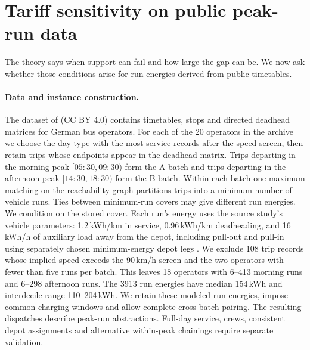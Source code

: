 \documentclass[11pt]{article}
\theoremstyle{definition}\newtheorem{definition}[theorem]{Definition}
\theoremstyle{remark}\newtheorem{remark}[theorem]{Remark}
\begin{document}
\section{Tariff sensitivity on public peak-run data}\label{sec:study}

The theory says when support can fail and how large the gap can be. We now ask
whether those conditions arise for run energies derived from public timetables.

\paragraph{Data and instance construction.}
The dataset of \citet{sistig2025dataset} (CC BY 4.0) contains timetables, stops
and directed deadhead matrices for German bus operators. For each of the 20
operators in the archive we choose the day type with the most service records
after the speed screen, then retain trips whose endpoints appear in the
deadhead matrix. Trips departing in the morning peak $[05{:}30,09{:}30)$ form the A batch
and trips departing in the afternoon peak $[14{:}30,18{:}30)$ form the B batch.
Within each batch one maximum matching on the reachability graph partitions
trips into a minimum number of vehicle runs. Ties between minimum-run covers
may give different run energies. We condition on the stored cover. Each run's energy uses
the source study's vehicle parameters: 1.2\,kWh/km in service, 0.96\,kWh/km
deadheading, and 16\,kWh/h of auxiliary load away from the depot, including
pull-out and pull-in using separately chosen minimum-energy depot legs
\citep{sistig2025electrification}. We
exclude 108 trip records whose implied speed exceeds the 90\,km/h screen and the two
operators with fewer than five runs per batch. This leaves 18 operators with
6--413 morning runs and 6--298 afternoon runs. The 3913 run energies have
median 154\,kWh and interdecile range 110--204\,kWh. We retain these modeled
run energies, impose common charging windows and allow complete cross-batch
pairing. The resulting dispatches describe peak-run abstractions. Full-day
service, crews, consistent depot assignments and alternative within-peak
chainings require separate validation.
\end{document}
